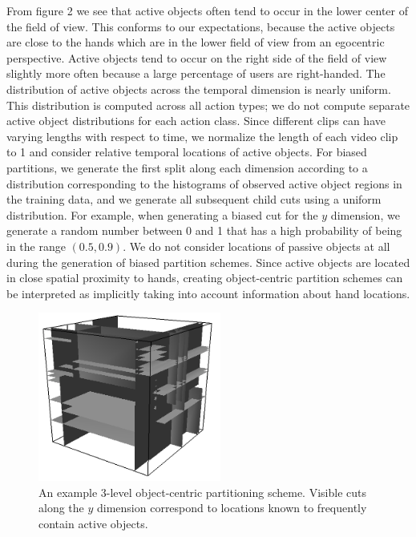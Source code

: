\documentclass{bmvc2k}
\begin{document}
	From figure 2 we see that active objects often tend to occur in the lower center
	of the field of view. This conforms to our expectations, because
	the active objects are close to the hands which are in the lower field of
	view from an egocentric perspective. Active objects tend to occur on the
  right side of the field of view slightly more often because a large
  percentage of users are right-handed.
  The distribution of active objects
  across the temporal dimension is nearly uniform. 
  This distribution is computed across all action types; we do not compute
  separate active object distributions for each action class.
  Since different clips can have
  varying lengths with respect to time, we normalize the length of each
  video clip to 1 and consider relative temporal locations of active
  objects. 
	For biased partitions, we generate
  the first split along each dimension according to a distribution
  corresponding to the histograms of observed active object regions in the training data,
  and we generate all subsequent child cuts using a uniform distribution.
  For example, when generating a biased cut for the $y$ dimension, 
  we generate a random number between 0 and 1 that has a high probability of
  being in the range $(0.5, 0.9)$.
  We do not consider locations of passive objects at all during the
  generation of biased partition schemes.
  Since active objects are located
  in close spatial proximity to hands, creating object-centric partition schemes can
  be interpreted as implicitly taking into account information about hand
  locations.
	\begin{figure}[t]
		\begin{center}
			  \includegraphics[width=6.0cm]{figures/lvl3-3.png}
		\end{center}
    \caption{An example 3-level object-centric partitioning scheme. Visible cuts along
    the $y$ dimension correspond to locations known to frequently contain
  active objects.} 
				\label{fig:long}
				\label{fig:onecol}
	\end{figure}
  
\end{document}
